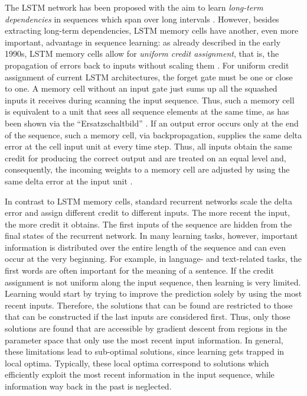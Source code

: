\documentclass{article}
\begin{document}
\begin{appendices}
The LSTM network has been proposed with the aim
to learn {\em long-term dependencies} in sequences
which span over long intervals
\cite{Hochreiter:97,Hochreiter:97e,Hochreiter:97f,Hochreiter:98}. 
However, besides extracting long-term dependencies, 
LSTM memory cells have another, even
more important, advantage in sequence learning:
as already described in the early 1990s,
LSTM memory cells allow for {\em uniform credit assignment}, that is,
the propagation of errors back to inputs without 
scaling them \cite{Hochreiter:91}. 
For uniform credit assignment of current LSTM architectures,
the forget gate  must be one or close to one.  
A memory cell without an input gate  just sums up all the squashed inputs it
receives during scanning the input sequence.
Thus, such a memory cell is equivalent to a unit that sees all sequence
elements at the same time, as has been shown via 
the ``Ersatzschaltbild'' \cite{Hochreiter:91}.
If an output error occurs only at the end of the sequence,
such a memory cell, via backpropagation, supplies
the same delta error at the cell input unit  at every time
step.
Thus, all inputs obtain the same credit for producing the correct
output and are treated on an equal level and, consequently, the incoming weights to a memory cell 
are adjusted by using the same delta error at the input unit .

In contrast to LSTM memory cells, standard recurrent networks scale
the delta error and assign different credit to different inputs.
The more recent the input, the more credit it obtains.
The first inputs of the sequence are hidden from the final states of
the recurrent network.
In many learning tasks, however, important information is distributed over
the entire length of the sequence and can even occur at the very beginning. For
example, in language- and text-related tasks, 
the first words are often important for the meaning of a sentence. 
If the credit assignment is not uniform along the input sequence, then
learning is very limited. Learning would start by trying to improve
the prediction solely by using the most recent inputs.
Therefore, the solutions that can be found are restricted to those
that can be constructed if the last inputs are considered first.
Thus, only those solutions are found that are accessible by gradient
descent from regions in the parameter space that only use the most recent input information.
In general, these limitations lead to sub-optimal solutions, since 
learning gets trapped in local optima. 
Typically, these local optima correspond to solutions 
which efficiently exploit the most recent information in the input
sequence, while information way back in the past is neglected.


\end{appendices}
\end{document}
